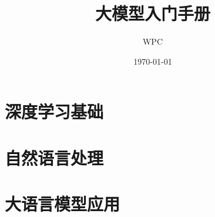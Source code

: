 \documentclass[UTF8]{ctexbook}
\title{大模型入门手册}
\author{WPC}
\date{\today}
\numberwithin{figure}{chapter}
\numberwithin{table}{chapter}
\begin{document}
\maketitle
\tableofcontents

\part{深度学习基础}





\part{自然语言处理}






\part{大语言模型应用}





\end{document}
